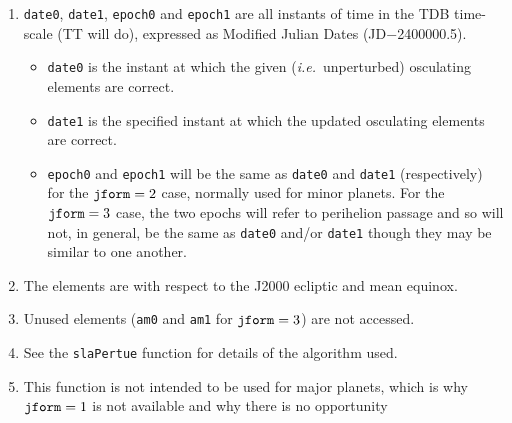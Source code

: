 \documentclass[11pt,fleqn,twoside]{article}
\renewcommand{\_}{{\tt\char'137}}     %
\begin{document}
{\begin{enumerate}
        \begin{tabbing}
        xxx \= xxxxxxxx \= xx \= \kill
        \> {\tt epoch}  \> = \> epoch of perihelion $T$ (TDB MJD) \\
        \> {\tt orbinc} \> = \> inclination $i$ (radians) \\
        \> {\tt anode}  \> = \> longitude of the ascending node
                                $\Omega$ (radians) \\
        \> {\tt perih}  \> = \> argument of perihelion $\omega$ (radians) \\
        \> {\tt aorq}   \> = \> perihelion distance $q$ (AU) \\
        \> {\tt e}      \> = \> eccentricity $e$ $( 0 \leq e \leq 10 )$
        \end{tabbing}
 \item {\tt date0}, {\tt date1}, {\tt epoch0} and
       {\tt epoch1} are all instants of time in
       the TDB time-scale (TT will do), expressed
       as Modified Julian Dates (JD$-$2400000.5).
       \begin{itemize}
       \item {\tt date0} is the instant at which the given
             ({\it i.e.}~unperturbed) osculating elements are correct.
       \item {\tt date1} is the specified instant at
             which the updated osculating
             elements are correct.
       \item {\tt epoch0} and {\tt epoch1} will
             be the same as {\tt date0} and {\tt date1}
             (respectively) for the ${\tt jform}=2$ case,
             normally used for minor
             planets.  For the ${\tt jform}=3$ case,
             the two epochs will refer to
             perihelion passage and so will not,
             in general, be the same as
             {\tt date0} and/or {\tt date1}
             though they may be similar to one another.
       \end{itemize}
 \item The elements are with respect to the
       J2000 ecliptic and mean equinox.
 \item Unused elements ({\tt am0} and {\tt am1}
       for ${\tt jform}=3$) are not accessed.
 \item See the {\tt slaPertue} function for details of the algorithm used.
 \item This function is not intended to be used for major planets, which
       is why ${\tt jform}=1$ is not available
       and why there is no opportunity

\end{enumerate}}
\end{document}
